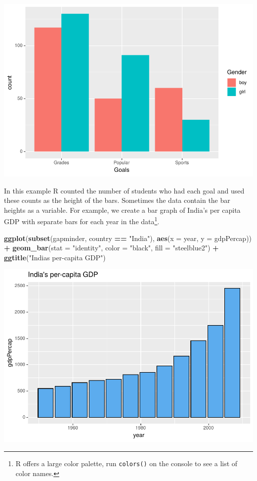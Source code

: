 \documentclass[
]{krantz}
\makeatletter
\newenvironment{Shaded}{\begin{snugshade}}{\end{snugshade}}
\newcommand{\DataTypeTok}[1]{\textcolor[rgb]{0.27,0.27,0.27}{#1}}
\newcommand{\KeywordTok}[1]{\textcolor[rgb]{0.27,0.27,0.27}{\textbf{#1}}}
\newcommand{\NormalTok}[1]{#1}
\newcommand{\OperatorTok}[1]{\textcolor[rgb]{0.43,0.43,0.43}{\textbf{#1}}}
\newcommand{\StringTok}[1]{\textcolor[rgb]{0.5,0.5,0.5}{#1}}
\newenvironment{kframe}{%
\medskip{}
\setlength{\fboxsep}{.8em}
 \def\at@end@of@kframe{}%
 \ifinner\ifhmode%
  \def\at@end@of@kframe{\end{minipage}}%
  \begin{minipage}{\columnwidth}%
 \fi\fi%
 \def\FrameCommand##1{\hskip\@totalleftmargin \hskip-\fboxsep
 \colorbox{shadecolor}{##1}\hskip-\fboxsep
     \hskip-\linewidth \hskip-\@totalleftmargin \hskip\columnwidth}%
 \MakeFramed {\advance\hsize-\width
   \@totalleftmargin\z@ \linewidth\hsize
   \@setminipage}}%
 {\par\unskip\endMakeFramed%
 \at@end@of@kframe}
\renewenvironment{Shaded}{\begin{kframe}}{\end{kframe}}
\makeatother
\begin{document}
\includegraphics{bookdown_files/figure-latex/unnamed-chunk-80-3.pdf}

In this example R counted the number of students who had each goal and used these counts as the height of the bars. Sometimes the data contain the bar heights as a variable. For example, we create a bar graph of India's per capita GDP with separate bars for each year in the data\footnote{R offers a large color palette, run \texttt{colors()} on the console to see a list of color names.}.

\begin{Shaded}
\begin{Highlighting}[]
\KeywordTok{ggplot}\NormalTok{(}\KeywordTok{subset}\NormalTok{(gapminder, country }\OperatorTok{==}\StringTok{ "India"}\NormalTok{), }\KeywordTok{aes}\NormalTok{(}\DataTypeTok{x =}\NormalTok{ year, }\DataTypeTok{y =}\NormalTok{ gdpPercap)) }\OperatorTok{+}\StringTok{ }
\StringTok{    }\KeywordTok{geom\_bar}\NormalTok{(}\DataTypeTok{stat =} \StringTok{"identity"}\NormalTok{, }\DataTypeTok{color =} \StringTok{"black"}\NormalTok{, }\DataTypeTok{fill =} \StringTok{"steelblue2"}\NormalTok{) }\OperatorTok{+}\StringTok{ }
\StringTok{    }\KeywordTok{ggtitle}\NormalTok{(}\StringTok{"India\textquotesingle{}s per{-}capita GDP"}\NormalTok{)}
\end{Highlighting}
\end{Shaded}

\includegraphics{bookdown_files/figure-latex/unnamed-chunk-81-1.pdf}
\end{document}
